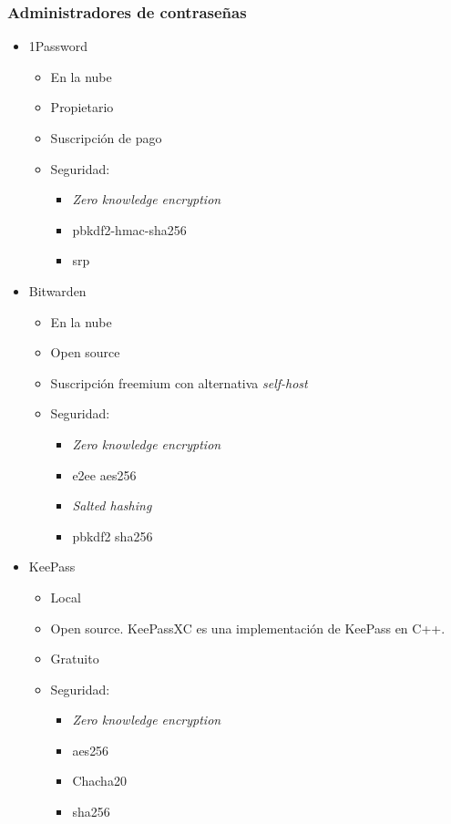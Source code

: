 \subsubsection{Administradores de contraseñas}
\begin{itemize}
    \item 1Password
    \begin{itemize}
        \item En la nube
        \item Propietario
        \item Suscripción de pago
        \item Seguridad: \cite{1passencryption}
        \begin{itemize}
            \item \textit{Zero knowledge encryption}
            \item \gls{pbkdf}2-\gls{hmac}-\gls{sha}256
            \item \gls{srp}
        \end{itemize}
    \end{itemize}

    \item Bitwarden
        \begin{itemize}
            \item En la nube
            \item Open source
            \item Suscripción \gls{freemium} con alternativa \textit{self-host}
            \item Seguridad: \cite{bitencryption}
            \begin{itemize}
                \item \textit{Zero knowledge encryption}
                \item \gls{e2ee} \gls{aes}256
                \item \textit{Salted hashing}
                \item \gls{pbkdf}2 \gls{sha}256
            \end{itemize}
        \end{itemize}

    \item KeePass
    \begin{itemize}
        \item Local
        \item Open source. KeePassXC es una implementación de KeePass en C++.
        \item Gratuito
        \item Seguridad: \cite{keepencription}
        \begin{itemize}
            \item \textit{Zero knowledge encryption}
            \item \gls{aes}256
            \item Chacha20
            \item \gls{sha}256
        \end{itemize}
    \end{itemize}


\end{itemize}
